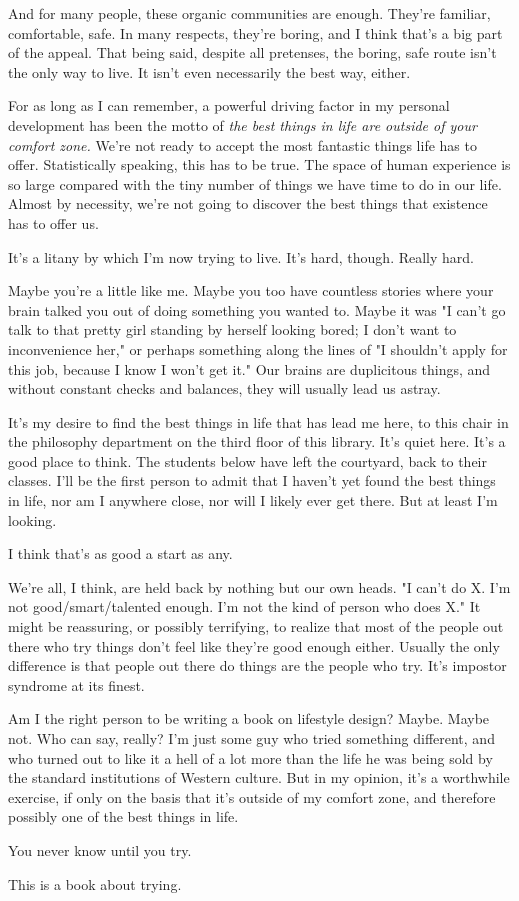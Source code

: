 \documentclass[../the-millions-of-gestures.tex]{subfiles}
\begin{document}
And for many people, these organic communities are enough. They're familiar,
comfortable, safe. In many respects, they're boring, and I think that's a big
part of the appeal. That being said, despite all pretenses, the boring, safe
route isn't the only way to live. It isn't even necessarily the best way,
either.

For as long as I can remember, a powerful driving factor in my personal
development has been the motto of \emph{the best things in life are outside of
your comfort zone.} We're not ready to accept the most fantastic things life has
to offer. Statistically speaking, this has to be true. The space of human
experience is so large compared with the tiny number of things we have time to
do in our life.  Almost by necessity, we're not going to discover the best
things that existence has to offer us.

It's a litany by which I'm now trying to live. It's hard, though. Really hard.

Maybe you're a little like me. Maybe you too have countless stories where your
brain talked you out of doing something you wanted to. Maybe it was "I can't go
talk to that pretty girl standing by herself looking bored; I don't want to
inconvenience her," or perhaps something along the lines of "I shouldn't apply
for this job, because I know I won't get it." Our brains are duplicitous things,
and without constant checks and balances, they will usually lead us astray.

It's my desire to find the best things in life that has lead me here, to this
chair in the philosophy department on the third floor of this library. It's
quiet here. It's a good place to think. The students below have left the
courtyard, back to their classes. I'll be the first person to admit that I
haven't yet found the best things in life, nor am I anywhere close, nor will I
likely ever get there. But at least I'm looking.

I think that's as good a start as any.

We're all, I think, are held back by nothing but our own heads. "I can't do X.
I'm not good/smart/talented enough. I'm not the kind of person who does X." It
might be reassuring, or possibly terrifying, to realize that most of the people
out there who try things don't feel like they're good enough either. Usually
the only difference is that people out there do things are the people who try.
It's impostor syndrome at its finest.

Am I the right person to be writing a book on lifestyle design? Maybe. Maybe
not. Who can say, really? I'm just some guy who tried something different, and
who turned out to like it a hell of a lot more than the life he was being sold
by the standard institutions of Western culture. But in my opinion, it's a
worthwhile exercise, if only on the basis that it's outside of my comfort zone,
and therefore possibly one of the best things in life.

You never know until you try.

This is a book about trying.
\end{document}
